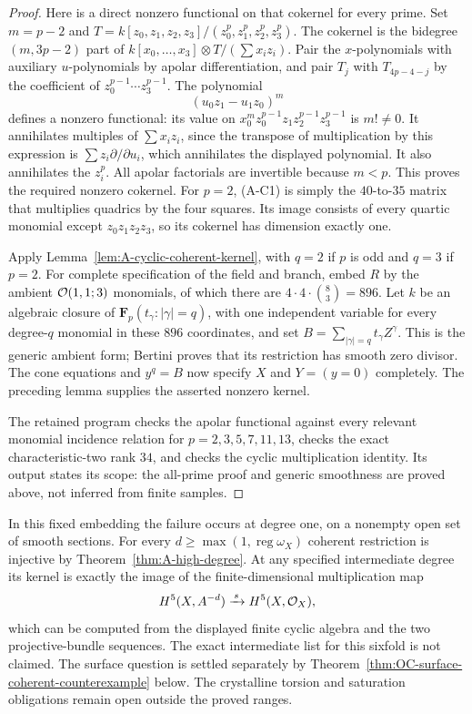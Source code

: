 \begin{proof}
Here is a direct nonzero functional on that cokernel for every
prime. Set $m=p-2$ and
$T=k[z_0,z_1,z_2,z_3]/(z_0^p,z_1^p,z_2^p,z_3^p)$.
The cokernel is the bidegree $(m,3p-2)$ part of
$k[x_0,\ldots,x_3]\otimes T/(\sum x_i z_i)$.
Pair the $x$-polynomials with auxiliary $u$-polynomials by
apolar differentiation, and pair $T_j$ with $T_{4p-4-j}$
by the coefficient of $z_0^{p-1}\cdots z_3^{p-1}$.
The polynomial
\[
                    (u_0z_1-u_1z_0)^m
\]
defines a nonzero functional: its value on
$x_0^m z_0^{p-1}z_1z_2^{p-1}z_3^{p-1}$ is $m!\ne0$.
It annihilates multiples of $\sum x_i z_i$, since the
transpose of multiplication by this expression is
$\sum z_i\partial/\partial u_i$, which annihilates the
displayed polynomial. It also annihilates the $z_i^p$.
All apolar factorials are invertible because $m<p$.
This proves the required nonzero cokernel.
For $p=2$, (A-C1) is simply the $40$-to-$35$ matrix that
multiplies quadrics by the four squares. Its image consists
of every quartic monomial except $z_0z_1z_2z_3$, so its
cokernel has dimension exactly one.

Apply Lemma~\ref{lem:A-cyclic-coherent-kernel}, with $q=2$
if $p$ is odd and $q=3$ if $p=2$. For complete specification
of the field and branch, embed $R$ by the ambient
$\mathcal O(1,1;3)$ monomials, of which there are
$4\cdot4\cdot\binom83=896$.
Let $k$ be an algebraic closure of
$\mathbf F_p(t_\gamma:|\gamma|=q)$, with one independent
variable for every degree-$q$ monomial in these $896$
coordinates, and set $B=\sum_{|\gamma|=q}t_\gamma Z^\gamma$.
This is the generic ambient form; Bertini proves that
its restriction has smooth zero divisor. The cone equations
and $y^q=B$ now specify $X$ and $Y=(y=0)$ completely.
The preceding lemma supplies the asserted nonzero kernel.

The retained program 
checks the apolar functional against every relevant monomial
incidence relation for $p=2,3,5,7,11,13$, checks the exact
characteristic-two rank $34$, and checks the cyclic
multiplication identity. Its output states its scope:
the all-prime proof and generic smoothness are proved above,
not inferred from finite samples.
\end{proof}

\begin{remark}
\label{rem:A-cyclic-degree-scope}
In this fixed embedding the failure occurs at degree one,
on a nonempty open set of smooth sections. For every
$d\geq\max(1,\operatorname{reg}\omega_X)$ coherent restriction
is injective by Theorem~\ref{thm:A-high-degree}.
At any specified intermediate degree its kernel is exactly
the image of the finite-dimensional multiplication map
\[
 H^5(X,A^{-d})\xrightarrow{\,s\,}H^5(X,\mathcal O_X),
\]
which can be computed from the displayed finite cyclic algebra
and the two projective-bundle sequences. The exact intermediate
list for this sixfold is not claimed. The surface question is
settled separately by Theorem~\ref{thm:OC-surface-coherent-counterexample}
below. The crystalline torsion and saturation obligations remain
open outside the proved ranges.
\end{remark}

